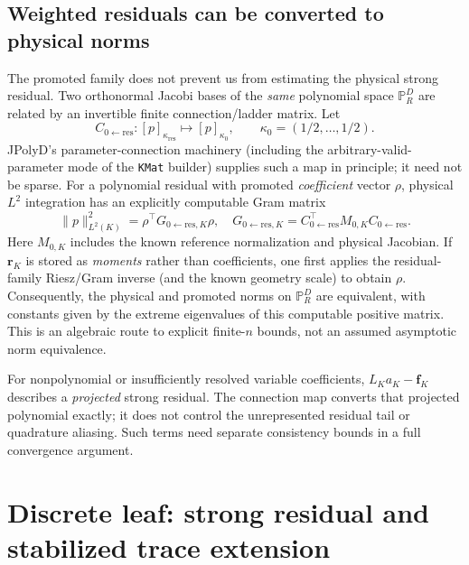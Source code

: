 \documentclass[11pt]{article}
\newcommand{\Pp}{\mathbb P}
\begin{document}
\subsection{Weighted residuals can be converted to physical norms}
\label{sec:full_weighted_conversion}
The promoted family does not prevent us from estimating the physical
strong residual.  Two orthonormal Jacobi bases of the \emph{same}
polynomial space $\Pp_R^D$ are related by an invertible finite
connection/ladder matrix.  Let
\begin{equation}\label{eq:full_connection}
 C_{0\leftarrow\mathrm{res}}:
 [p]_{\kappa_{\mathrm{res}}}\longmapsto
 [p]_{\kappa_0},\qquad \kappa_0=(1/2,\ldots,1/2).
\end{equation}
JPolyD's parameter-connection machinery (including the arbitrary-valid-
parameter mode of the \texttt{KMat} builder) supplies such a map in
principle; it need not be sparse.  For a polynomial residual with
promoted \emph{coefficient} vector $\rho$, physical $L^2$ integration
has an explicitly computable Gram matrix
\begin{equation}\label{eq:full_residual_gram}
 \|p\|_{L^2(K)}^2
 =\rho^\top G_{0\leftarrow\mathrm{res},K}\rho,
 \quad G_{0\leftarrow\mathrm{res},K}
 =C_{0\leftarrow\mathrm{res}}^\top M_{0,K}
  C_{0\leftarrow\mathrm{res}}.
\end{equation}
Here $M_{0,K}$ includes the known reference normalization and physical
Jacobian.  If $\bm r_K$ is stored as \emph{moments} rather than coefficients,
one first applies the residual-family Riesz/Gram inverse (and the
known geometry scale) to obtain $\rho$.  Consequently, the physical
and promoted norms on $\Pp_R^D$ are equivalent, with constants given
by the extreme eigenvalues of this computable positive matrix.  This
is an algebraic route to explicit finite-$n$ bounds, not an assumed
asymptotic norm equivalence.

For nonpolynomial or insufficiently resolved variable coefficients,
$L_Ka_K-\bm f_K$ describes a \emph{projected} strong residual.  The
connection map converts that projected polynomial exactly; it does
not control the unrepresented residual tail or quadrature aliasing.
Such terms need separate consistency bounds in a full convergence
argument.
\newpage
\section{Discrete leaf: strong residual and stabilized trace extension}
\end{document}
